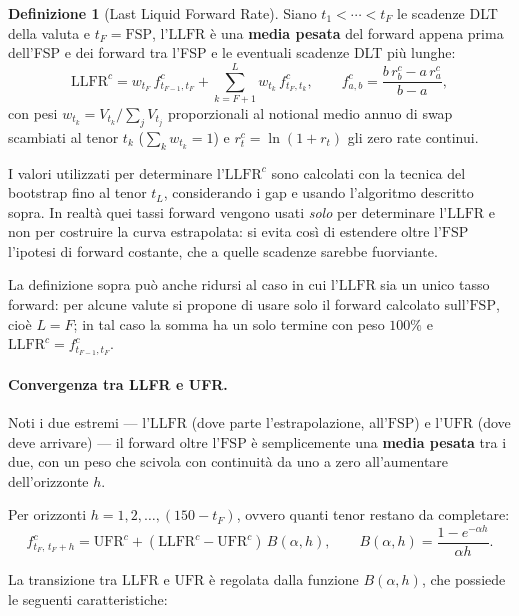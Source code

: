 \documentclass[11pt,a4paper]{article}
\theoremstyle{plain}
\theoremstyle{definition}
\newtheorem{definizione}[teorema]{Definizione}
\theoremstyle{remark}
\newcommand{\UFR}{\mathrm{UFR}}
\newcommand{\LLFR}{\mathrm{LLFR}}
\newcommand{\FSP}{\mathrm{FSP}}
\begin{document}
\begin{definizione}[Last Liquid Forward Rate]
\label{def:llfr}
Siano $t_1<\cdots<t_F$ le scadenze DLT della valuta e $t_F=\FSP$, l'$\LLFR$ \`e una \textbf{media pesata}
del forward appena prima dell'FSP e dei forward tra l'FSP e le eventuali scadenze DLT pi\`u
lunghe:
\begin{equation}
  \label{eq:llfr}
  \LLFR^c = w_{t_F}\,f^c_{t_{F-1},t_F} + \sum_{k=F+1}^{L} w_{t_k}\,f^c_{t_F,t_k},
  \qquad
  f^c_{a,b} = \frac{b\,r^c_b - a\,r^c_a}{b-a},
\end{equation}
con pesi $w_{t_k}=V_{t_k}/\sum_j V_{t_j}$ proporzionali al notional medio annuo di swap
scambiati al tenor $t_k$ ($\sum_k w_{t_k}=1$) e $r^c_t=\ln(1+r_t)$ gli zero rate continui.

I valori utilizzati per determinare l'$\LLFR^c$ sono calcolati con la tecnica del bootstrap
fino al tenor $t_L$, considerando i gap e usando l'algoritmo descritto sopra. In realt\`a
quei tassi forward vengono usati \emph{solo} per determinare l'$\LLFR$ e non per costruire la
curva estrapolata: si evita cos\`i di estendere oltre l'$\FSP$ l'ipotesi di forward costante,
che a quelle scadenze sarebbe fuorviante.

\end{definizione}

La definizione sopra pu\`o anche ridursi al caso in cui l'$\LLFR$ sia un unico tasso forward:
per alcune valute si propone di usare solo il forward calcolato sull'$\FSP$, cio\`e $L=F$; in
tal caso la somma ha un solo termine con peso $100\%$ e $\LLFR^c=f^c_{t_{F-1},t_F}$.

\paragraph{Convergenza tra LLFR e UFR.}
Noti i due estremi --- l'$\LLFR$ (dove parte l'estrapolazione, all'$\FSP$) e l'$\UFR$ (dove deve
arrivare) --- il forward oltre l'$\FSP$ \`e semplicemente una \textbf{media pesata}
tra i due, con un peso che scivola con continuit\`a da uno a zero all'aumentare
dell'orizzonte $h$.

Per orizzonti $h=1,2,\ldots,(150-t_F)$, ovvero quanti tenor restano da completare:
\begin{equation}
  f^c_{t_F,\,t_F+h} = \UFR^c + (\LLFR^c - \UFR^c)\,B(\alpha,h),
  \qquad
  B(\alpha,h) = \frac{1 - e^{-\alpha h}}{\alpha h}.
  \label{eq:extrap-fwd}
\end{equation}


La transizione tra $\LLFR$ e $\UFR$ è regolata dalla funzione $B(\alpha,h)$, che possiede le seguenti caratteristiche:
\end{document}

